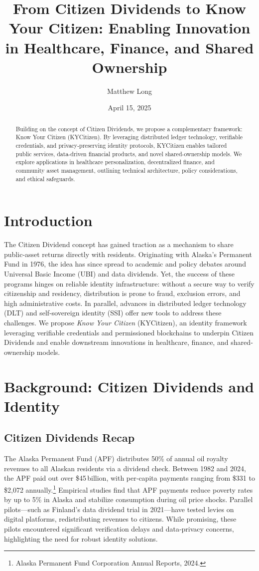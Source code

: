 \documentclass[11pt]{article}
\title{From Citizen Dividends to Know Your Citizen: Enabling Innovation in Healthcare, Finance, and Shared Ownership}
\author{Matthew Long}
\date{April 15, 2025}
\begin{document}
\maketitle

\begin{abstract}
Building on the concept of Citizen Dividends, we propose a complementary framework: Know Your Citizen (KYCitizen). By leveraging distributed ledger technology, verifiable credentials, and privacy-preserving identity protocols, KYCitizen enables tailored public services, data-driven financial products, and novel shared-ownership models. We explore applications in healthcare personalization, decentralized finance, and community asset management, outlining technical architecture, policy considerations, and ethical safeguards.
\end{abstract}

\tableofcontents
\newpage

\section{Introduction}
The Citizen Dividend concept has gained traction as a mechanism to share public‐asset returns directly with residents. Originating with Alaska’s Permanent Fund in 1976, the idea has since spread to academic and policy debates around Universal Basic Income (UBI) and data dividends. Yet, the success of these programs hinges on reliable identity infrastructure: without a secure way to verify citizenship and residency, distribution is prone to fraud, exclusion errors, and high administrative costs. In parallel, advances in distributed ledger technology (DLT) and self‐sovereign identity (SSI) offer new tools to address these challenges. We propose \emph{Know Your Citizen} (KYCitizen), an identity framework leveraging verifiable credentials and permissioned blockchains to underpin Citizen Dividends and enable downstream innovations in healthcare, finance, and shared‐ownership models.

\section{Background: Citizen Dividends and Identity}
\subsection{Citizen Dividends Recap}
The Alaska Permanent Fund (APF) distributes 50\% of annual oil royalty revenues to all Alaskan residents via a dividend check. Between 1982 and 2024, the APF paid out over \$45 billion, with per‐capita payments ranging from \$331 to \$2,072 annually.\footnote{Alaska Permanent Fund Corporation Annual Reports, 2024.} Empirical studies find that APF payments reduce poverty rates by up to 5\% in Alaska and stabilize consumption during oil price shocks.\cite{ub} Parallel pilots—such as Finland’s data dividend trial in 2021—have tested levies on digital platforms, redistributing revenues to citizens. While promising, these pilots encountered significant verification delays and data‐privacy concerns, highlighting the need for robust identity solutions.
\end{document}
